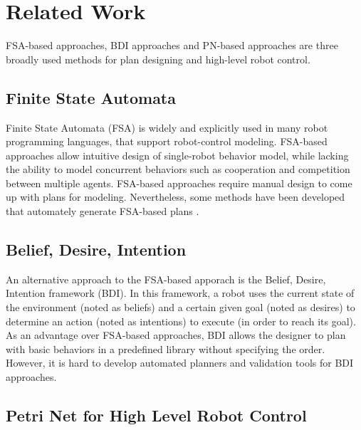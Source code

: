 \documentclass[12pt,a4paper,twocolumn]{article}
\begin{document}
\section{Related Work}
FSA-based approaches, BDI approaches and PN-based approaches are three broadly used methods for plan designing and high-level robot control.

\subsection{Finite State Automata}

Finite State Automata (FSA) is widely and explicitly used in many robot programming languages, that support robot-control modeling. FSA-based approaches allow intuitive design of single-robot behavior model, while lacking the ability to model concurrent behaviors such as cooperation and competition between multiple agents. FSA-based approaches require manual design to come up with plans for modeling. Nevertheless, some methods have been developed that automately generate FSA-based plans \cite{kress2009temporal}.  

\subsection{Belief, Desire, Intention}

An alternative approach to the FSA-based apporach is the Belief, Desire, Intention framework (BDI). In this framework, a robot uses the current state of the environment (noted as beliefs) and a certain given goal (noted as desires) to determine an action (noted as intentions) to execute (in order to reach its goal). As an advantage over FSA-based approaches, BDI allows the designer to plan with basic behaviors in a predefined library without specifying the order. However, it is hard to develop automated planners and validation tools for BDI approaches.  

\subsection{Petri Net for High Level Robot Control}
\end{document}
